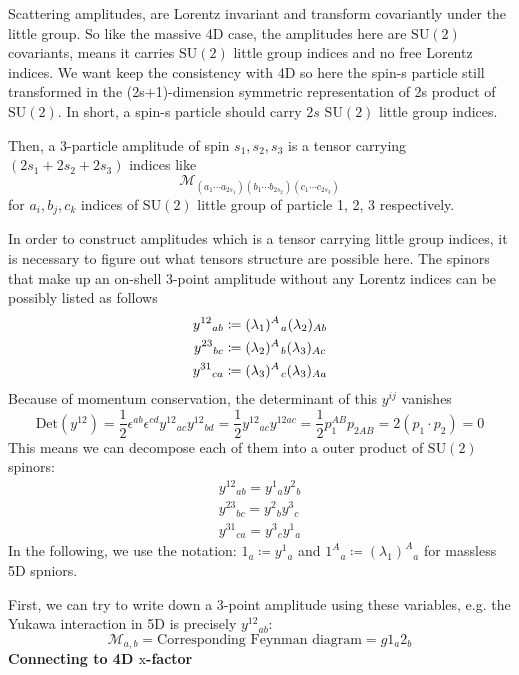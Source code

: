\documentclass[12pt]{article}
\newcommand{\smallkern}{\kern0.08em}
\begin{document}
Scattering amplitudes, are Lorentz invariant and transform covariantly under the little group. So like the massive 4D case, the amplitudes here are $\mathrm{SU}(2)$ covariants, means it carries $\mathrm{SU}(2)$ little group indices and no free Lorentz indices. We want keep the consistency with 4D so here the spin-s particle still transformed in the (2s+1)-dimension symmetric representation of 2s product of $\mathrm{SU}(2)$. In short, a spin-s particle should carry $2s$ $\mathrm{SU}(2)$ little group indices. 

Then, a 3-particle amplitude of spin $s_1,s_2,s_3$ is a tensor carrying $(2s_1+2s_2+2s_3)$ indices like
\begin{equation}
    \mathcal{M}_{(a_1 \cdots a_{2s_1})(b_1 \cdots b_{2s_2})(c_1 \cdots c_{2s_3})}
\end{equation} 
for $a_i, b_j, c_k$ indices of $\mathrm{SU}(2)$ little group of particle 1, 2, 3 respectively.

In order to construct amplitudes which is a tensor carrying little group indices, it is necessary to figure out what tensors structure are possible here. The spinors that make up an on-shell 3-point amplitude without any Lorentz indices can be possibly listed as follows
\begin{gather}
    y^{12}{}_{ab}\coloneqq (\lambda_1)^A\kern0.08em_a (\lambda_2)_{Ab}\\
    y^{23}{}_{bc}\coloneqq (\lambda_2)^A\smallkern_b (\lambda_3)_{Ac}\\
    y^{31}{}_{ca}\coloneqq (\lambda_3)^A\smallkern_c (\lambda_3)_{Aa}
\end{gather}
Because of momentum conservation, the determinant of this $y^{ij}$ vanishes 
\begin{equation}
    \mathrm{Det}(y^{12})=\frac{1}{2}\epsilon^{ab}\epsilon^{cd}y^{12}{}_{ac}y^{12}{}_{bd}=\frac{1}{2}y^{12}{}_{ac}y^{12ac}=\frac{1}{2}p_1^{AB}p_{2AB}=2(p_1\cdot p_2)=0
\end{equation}
This means we can decompose each of them into a outer product of $\mathrm{SU}(2)$ spinors:
\begin{gather}
    y^{12}{}_{ab}=y^1{}_ay^2{}_b\\
    y^{23}{}_{bc}=y^2{}_by^3{}_c\\
    y^{31}{}_{ca}=y^3{}_cy^1{}_a
\end{gather}
In the following, we use the notation: $1_a\coloneqq y^1{}_a$ and $1^A{}_a\coloneqq (\lambda_1)^A{}_a$ for massless 5D spniors.

First, we can try to write down a 3-point amplitude using these variables, e.g. the Yukawa interaction in 5D is precisely $y^12{}_{ab}$:
\begin{equation}
    \mathcal{M}_{a,b}=\text{Corresponding Feynman diagram} = g1_a2_b 
\end{equation}
\textbf{Connecting to 4D $\mathrm{x}$-factor}
\end{document}
